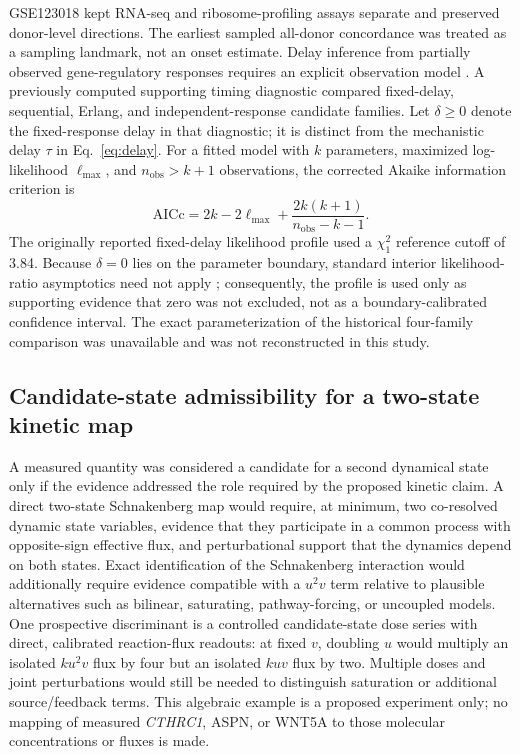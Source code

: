 \documentclass[preprint,11pt]{elsarticle}
\newcommand{\cthrc}{\textit{CTHRC1}}
\begin{document}
GSE123018 kept RNA-seq and ribosome-profiling assays separate and preserved donor-level directions. The earliest sampled all-donor concordance was treated as a sampling landmark, not an onset estimate. Delay inference from partially observed gene-regulatory responses requires an explicit observation model \cite{Hong2023}. A previously computed supporting timing diagnostic compared fixed-delay, sequential, Erlang, and independent-response candidate families. Let $\delta\ge0$ denote the fixed-response delay in that diagnostic; it is distinct from the mechanistic delay $\tau$ in Eq.~\eqref{eq:delay}. For a fitted model with $k$ parameters, maximized log-likelihood $\ell_{\max}$, and $n_{\mathrm{obs}}>k+1$ observations, the corrected Akaike information criterion is
\begin{equation}
\mathrm{AICc}=2k-2\ell_{\max}+\frac{2k(k+1)}{n_{\mathrm{obs}}-k-1}.
\label{eq:aicc}
\end{equation}
The originally reported fixed-delay likelihood profile used a $\chi^2_1$ reference cutoff of 3.84. Because $\delta=0$ lies on the parameter boundary, standard interior likelihood-ratio asymptotics need not apply \cite{SelfLiang1987}; consequently, the profile is used only as supporting evidence that zero was not excluded, not as a boundary-calibrated confidence interval. The exact parameterization of the historical four-family comparison was unavailable and was not reconstructed in this study.
\subsection{Candidate-state admissibility for a two-state kinetic map}
A measured quantity was considered a candidate for a second dynamical state only if the evidence addressed the role required by the proposed kinetic claim. A direct two-state Schnakenberg map would require, at minimum, two co-resolved dynamic state variables, evidence that they participate in a common process with opposite-sign effective flux, and perturbational support that the dynamics depend on both states. Exact identification of the Schnakenberg interaction would additionally require evidence compatible with a $u^2v$ term relative to plausible alternatives such as bilinear, saturating, pathway-forcing, or uncoupled models. One prospective discriminant is a controlled candidate-state dose series with direct, calibrated reaction-flux readouts: at fixed $v$, doubling $u$ would multiply an isolated $ku^2v$ flux by four but an isolated $kuv$ flux by two. Multiple doses and joint perturbations would still be needed to distinguish saturation or additional source/feedback terms. This algebraic example is a proposed experiment only; no mapping of measured \cthrc{}, ASPN, or WNT5A to those molecular concentrations or fluxes is made.
\end{document}
